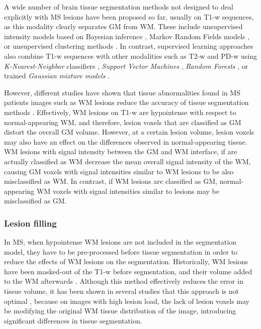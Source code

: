 A wide number of brain tissue segmentation methods not designed to deal explicitly with MS lesions have been proposed so far, usually on T1-w sequences, as this modality clearly separates GM from WM. These include unsupervised intensity models based on Bayesian inference \cite{Ashburner2005,Pohl2006,Roy2012,VanLeemput2003,Wells1996}, Markov Random Fields models \cite{Bricq2008, Tohka2010, Zhang2001}, or unsupervised clustering methods \cite{Caldairou2011, Pham2001}. In contrast, supervised learning approaches also combine T1-w sequences with other modalities such as T2-w and PD-w using \textit{K-Nearest-Neighbor} classifiers \cite{deBoer2009,Vrooman2013}, \textit{Support Vector Machines} \cite{Akselrod2006,Opbroek2013}, \textit{Random Forests} \cite{yi2009,Mahapatra2014}, or trained \textit{Gaussian mixture models} \cite{Rajchl2015}. 

However, different studies have shown that tissue abnormalities found in MS patients images such as WM lesions reduce the accuracy of tissue segmentation methods \cite{Battaglini2012, Chard2010}. Effectively, WM lesions on T1-w are hypointense with respect to normal-appearing WM, and  therefore, lesion voxels that are classified as GM distort the overall GM volume. However, at a certain lesion volume, lesion voxels may also have an effect on the differences observed in normal-appearing tissue. WM lesions with signal intensity between the GM and WM interface, if are actually classified as WM decrease the mean overall signal intensity of the WM, causing GM voxels with signal intensities similar to WM lesions to be also misclassified as WM.  In contrast, if WM lesions are classified as GM, normal-appearing WM voxels with signal intensities similar to lesions may be misclassified as GM. 
 
\subsubsection{Lesion filling}
\label{subsec:lesion_filling}
In MS, when hypointense WM lesions are not included in the segmentation model, they have to be pre-processed before tissue segmentation in order to reduce the effects of WM lesions on the segmentation. Historically, WM lesions have been masked-out of the T1-w before segmentation, and their volume added to the WM afterwards \cite{Chard2002}. Although this method effectively reduces the error in tissue volume, it has been shown in several studies that this approach is not optimal \cite{Battaglini2012, Chard2010}, because on images with high lesion load, the lack of lesion voxels may be modifying the original WM tissue distribution of the image, introducing significant differences in tissue segmentation. 

